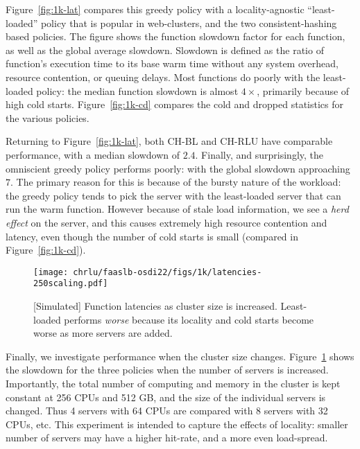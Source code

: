 Figure~\ref{fig:1k-lat} compares this greedy policy with a locality-agnostic ``least-loaded'' policy that is popular in web-clusters, and the two consistent-hashing based policies. 
The figure shows the function slowdown factor for each function, as well as the global average slowdown.
Slowdown is defined as the ratio of function's execution time to its base warm time without any system overhead, resource contention, or queuing delays.
Most functions do poorly with the least-loaded policy: the median function slowdown is almost $4\times$, primarily because of high cold starts.
Figure~\ref{fig:1k-cd} compares the cold and dropped statistics for the various policies.

Returning to Figure~\ref{fig:1k-lat}, both CH-BL and CH-RLU have comparable performance, with a median slowdown of $2.4$. 
Finally, and surprisingly, the omniscient greedy policy performs poorly: with the global slowdown approaching $7$.
The primary reason for this is because of the bursty nature of the workload: the greedy policy tends to pick the server with the least-loaded server that can run the warm function.
However because of stale load information, we see a \emph{herd effect} on the server, and this causes extremely high resource contention and latency, even though the number of cold starts is small (compared in Figure~\ref{fig:1k-cd}). 


\begin{figure}
  \centering
  \texttt{[image: chrlu/faaslb-osdi22/figs/1k/latencies-250scaling.pdf]}
  \caption{[Simulated] Function latencies as cluster size is increased. Least-loaded performs \emph{worse} because its locality and cold starts become worse as more servers are added.}
  \label{fig:1k-scaling}
\end{figure}

Finally, we investigate performance when the cluster size changes.
Figure~\ref{fig:1k-scaling} shows the slowdown for the three policies when the number of servers is increased.
Importantly, the total number of computing and memory in the cluster is kept constant at 256 CPUs and 512 GB, and the size of the individual servers is changed.
Thus 4 servers with 64 CPUs are compared with 8 servers with 32 CPUs, etc.
This experiment is intended to capture the effects of locality: smaller number of servers may have a higher hit-rate, and a more even load-spread.

